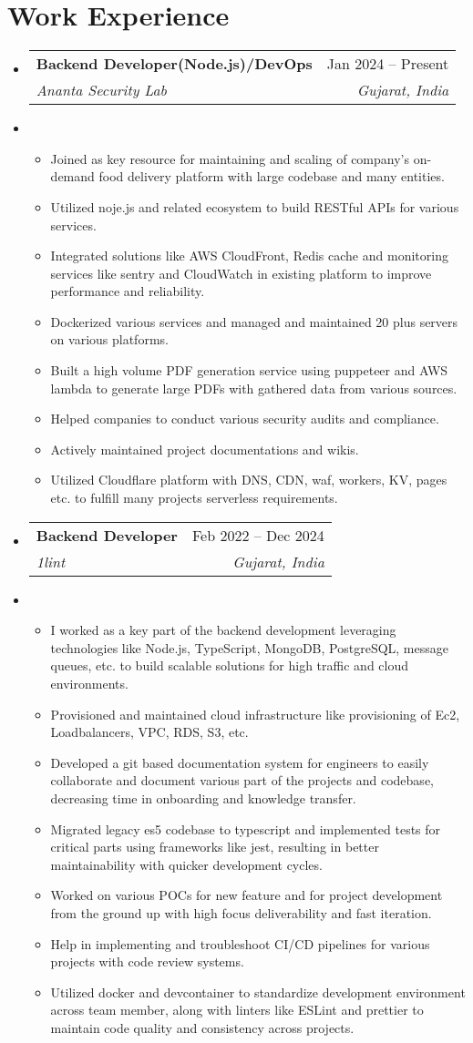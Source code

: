 \documentclass[letterpaper,12pt]{article}
\makeatletter
\newcommand{\resumeItem}[1]{
  \item\small{
    {#1 \vspace{-2pt}}
  }
}
\newcommand{\resumeSubheading}[4]{
  \vspace{-2pt}\item
    \begin{tabular*}{0.97\textwidth}[t]{l@{\extracolsep{\fill}}r}
      \textbf{#1} & #2 \\
      \textit{\small#3} & \textit{\small #4} \\
    \end{tabular*}\vspace{-7pt}
}
\newcommand{\resumeSubHeadingListStart}{\begin{itemize}[leftmargin=0.15in, label={}]}
\newcommand{\resumeSubHeadingListEnd}{\end{itemize}}
\newcommand{\resumeItemListStart}{\begin{itemize}}
\newcommand{\resumeItemListEnd}{\end{itemize}\vspace{-5pt}}
\makeatother
\begin{document}
\section{Work Experience}
\resumeSubHeadingListStart
\resumeSubheading
{Backend Developer(Node.js)/DevOps}{Jan 2024 -- Present}
{Ananta Security Lab}{Gujarat, India}
\resumeItem{
  \resumeItemListStart
  \resumeItem{Joined as key resource for maintaining and scaling of company's on-demand food delivery platform with large codebase and many entities.}
  \resumeItem{Utilized noje.js and related ecosystem to build RESTful APIs for various services.}
  \resumeItem{Integrated solutions like AWS CloudFront, Redis cache and monitoring services like sentry and CloudWatch in existing platform to improve performance and reliability.}
  \resumeItem{Dockerized various services and managed and maintained 20 plus servers on various platforms.}
  \resumeItem{Built a high volume PDF generation service using puppeteer and AWS lambda to generate large PDFs with gathered data from various sources.}
  \resumeItem{Helped companies to conduct various security audits and compliance.}
  \resumeItem{Actively maintained project documentations and wikis.}
  \resumeItem{Utilized Cloudflare platform with DNS, CDN, waf, workers, KV, pages etc. to fulfill many projects serverless requirements.}
  \resumeItemListEnd
}
\resumeSubHeadingListEnd
\resumeSubHeadingListStart
\resumeSubheading
{Backend Developer}{Feb 2022 -- Dec 2024}
{1lint}{Gujarat, India}
\resumeItem{
  \resumeItemListStart
  \resumeItem{I worked as a key part of the backend development leveraging technologies like Node.js, TypeScript, MongoDB, PostgreSQL, message queues, etc. to build scalable solutions for high traffic and cloud environments.}
  \resumeItem{Provisioned and maintained cloud infrastructure like provisioning of Ec2, Loadbalancers, VPC, RDS, S3, etc.}
  \resumeItem{Developed a git based documentation system for engineers to easily collaborate and document various part of the projects and codebase, decreasing time in onboarding and knowledge transfer.}
  \resumeItem{Migrated legacy es5 codebase to typescript and implemented tests for critical parts using frameworks like jest, resulting in better maintainability with quicker development cycles.}
  \resumeItem{Worked on various POCs for new feature and for project development from the ground up with high focus deliverability and fast iteration.}
  \resumeItem{Help in implementing and troubleshoot CI/CD pipelines for various projects with code review systems.}
  \resumeItem{Utilized docker and devcontainer to standardize development environment across team member, along with linters like ESLint and prettier to maintain code quality and consistency across projects.}
  \resumeItemListEnd
}
\resumeSubHeadingListEnd
\end{document}
